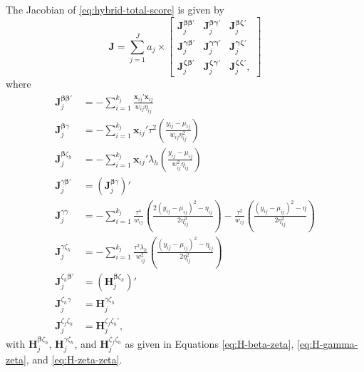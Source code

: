 \documentclass[
  man, donotrepeattitle,floatsintext]{apa7}
\begin{document}
The Jacobian of \eqref{eq:hybrid-total-score} is given by
\[
\mathbf{J} = \sum_{j=1}^J a_j \times \left[\begin{array}{ccc}
\mathbf{J}_j^{\boldsymbol\beta\boldsymbol\beta'} & \mathbf{J}_j^{\boldsymbol\beta \boldsymbol\gamma'} & \mathbf{J}_j^{\boldsymbol\beta \boldsymbol\zeta'} \\ 
\mathbf{J}_j^{\boldsymbol\gamma\boldsymbol\beta'} & \mathbf{J}_j^{\boldsymbol\gamma \boldsymbol\gamma'} & \mathbf{J}_j^{\boldsymbol\gamma \boldsymbol\zeta'} \\
\mathbf{J}_j^{\boldsymbol\zeta\boldsymbol\beta'} & \mathbf{J}_j^{\boldsymbol\zeta \boldsymbol\gamma'} & \mathbf{J}_j^{\boldsymbol\zeta \boldsymbol\zeta'},
\end{array}\right]
\]
where
\[
\begin{aligned}
\mathbf{J}_j^{\boldsymbol\beta\boldsymbol\beta'} &= - \sum_{i=1}^{k_j}  \frac{\mathbf{x}_{ij}' \mathbf{x}_{ij}}{w_{ij} \eta_{ij}} \\
\mathbf{J}_j^{\boldsymbol\beta \gamma} &= - \sum_{i=1}^{k_j} \mathbf{x}_{ij}' \tau^2 \left(\frac{y_{ij} - \mu_{ij}}{w_{ij} \eta_{ij}^2} \right) \\
\mathbf{J}_j^{\boldsymbol\beta \zeta_h} &= - \sum_{i=1}^{k_j} \mathbf{x}_{ij}' \lambda_h \left(\frac{y_{ij} - \mu_{ij}}{w_{ij}^2 \eta_{ij}} \right) \\
\mathbf{J}_j^{\gamma \boldsymbol\beta'} &= \left(\mathbf{J}_j^{\boldsymbol\beta \gamma}\right)' \\
\mathbf{J}_j^{\gamma \gamma} &= - \sum_{i=1}^{k_j} \frac{\tau^4}{w_{ij}} \left(\frac{2(y_{ij} - \mu_{ij})^2 - \eta_{ij}}{2 \eta_{ij}^3}\right) - \frac{\tau^2}{w_{ij}} \left(\frac{(y_{ij} - \mu_{ij})^2 - \eta}{2 \eta_{ij}^2}\right) \\
\mathbf{J}_j^{\gamma \zeta_h} &= - \sum_{i=1}^{k_j} \frac{\tau^2 \lambda_h}{w_{ij}^2}  \left(\frac{(y_{ij} - \mu_{ij})^2 - \eta_{ij}}{2\eta_{ij}^2}\right)\\  
\mathbf{J}_j^{\zeta_h \boldsymbol\beta'} &= \left(\mathbf{H}_{j}^{\boldsymbol\beta \zeta_h}\right)' \\
\mathbf{J}_j^{\zeta_h \gamma} &= \mathbf{H}_{j}^{\gamma \zeta_h} \\
\mathbf{J}_j^{\zeta_f \zeta_h} &= \mathbf{H}_{j}^{\zeta_f \zeta_h'},
\end{aligned}
\]
with \(\mathbf{H}_{j}^{\boldsymbol\beta \zeta_h}\), \(\mathbf{H}_{j}^{\gamma \zeta_h}\), and \(\mathbf{H}_{j}^{\zeta_f \zeta_h}\) as given in Equations \eqref{eq:H-beta-zeta}, \eqref{eq:H-gamma-zeta}, and \eqref{eq:H-zeta-zeta}.
\end{document}
